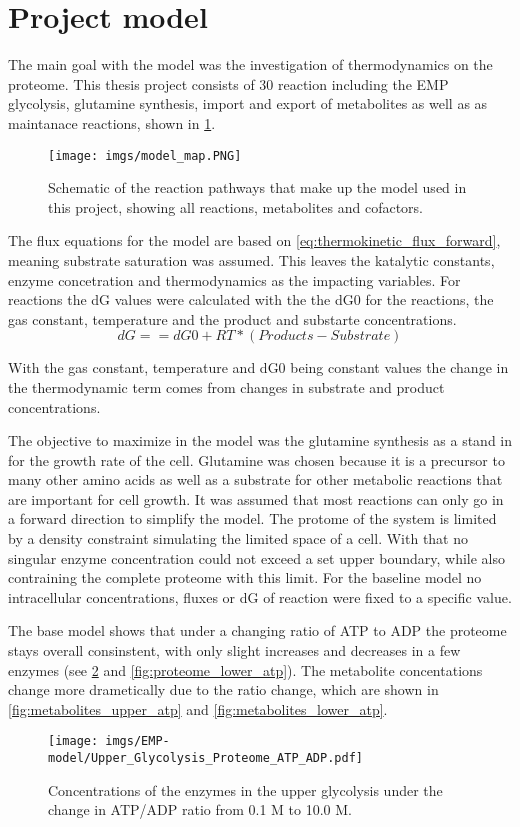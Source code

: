\section{Project model}
The main goal with the model was the investigation of thermodynamics on the proteome. 
This thesis project consists of 30 reaction including the EMP glycolysis, glutamine synthesis, import and export of metabolites as well as as maintanace reactions, shown in \ref{fig:model_map}. 
\begin{figure}[H]
    \centering
    \texttt{[image: imgs/model\_map.PNG]}
    \caption{Schematic of the reaction pathways that make up the model used in this project, showing all reactions, metabolites and cofactors.}
    \label{fig:model_map}
\end{figure}

The flux equations for the model are based on \ref{eq:thermokinetic_flux_forward}, meaning substrate saturation was assumed. This leaves the katalytic constants, enzyme concetration and thermodynamics as the impacting variables.
For reactions the dG values were calculated with the the dG0 for the reactions, the gas constant, temperature and the product and substarte concentrations.
\begin{equation}
    dG == dG0 + RT * (Products - Substrate)
    \label{eq:general_dG}
\end{equation}

With the gas constant, temperature and dG0 being constant values the change in the thermodynamic term comes from changes in substrate and product concentrations. 

The objective to maximize in the model was the glutamine synthesis as a stand in for the growth rate of the cell. Glutamine was chosen because it is a precursor to many other amino acids as well as a substrate for other metabolic reactions that are important for cell growth.
It was assumed that most reactions can only go in a forward direction to simplify the model. 
The protome of the system is limited by a density constraint simulating the limited space of a cell. With that no singular enzyme concentration could not exceed a set upper boundary, while also contraining the complete proteome with this limit.
For the baseline model no intracellular concentrations, fluxes or dG of reaction were fixed to a specific value. 

The base model shows that under a changing ratio of ATP to ADP the proteome stays overall consinstent, with only slight increases and decreases in a few enzymes (see \ref{fig:proteome_upper_atp} and \ref{fig:proteome_lower_atp}). The metabolite concentations change more drametically due to the ratio change, which are shown in \ref{fig:metabolites_upper_atp} and \ref{fig:metabolites_lower_atp}. 
\begin{figure}[H]
    \centering
    \texttt{[image: imgs/EMP-model/Upper\_Glycolysis\_Proteome\_ATP\_ADP.pdf]}
    \caption{Concentrations of the enzymes in the upper glycolysis under the change in ATP/ADP ratio from 0.1 M to 10.0 M.}
    \label{fig:proteome_upper_atp}
\end{figure}

